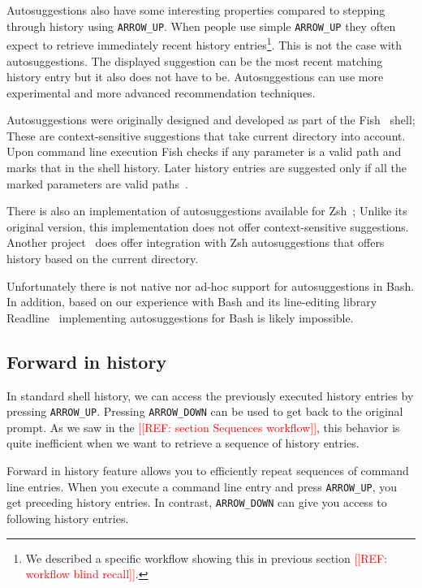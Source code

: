 \documentclass[thesis=M,english]{FITthesis}[2012/10/20]
\newcommand{\redtext}[1]{\textcolor{red}{[[#1]]}}
\let\myCite\cite
\renewcommand\cite{\unskip~\myCite}
\begin{document}
Autosuggestions also have some interesting properties compared to stepping through history using \verb|ARROW_UP|.
When people use simple \verb|ARROW_UP| they often expect to retrieve immediately recent history entries\footnote{We described a specific workflow showing this in previous section \redtext{REF: workflow blind recall}.}.  This is not the case with autosuggestions. The displayed suggestion can be the most recent matching history entry but it also does not have to be. Autosuggestions can use more experimental and more advanced recommendation techniques.

Autosuggestions were originally designed and developed as part of the Fish\cite{fishdocs} shell; These are context-sensitive suggestions that take current directory into account. Upon command line execution Fish checks if any parameter is a valid path and marks that in the shell history. Later history entries are suggested only if all the marked parameters are valid paths\cite{toolsfishissueautosuggestions}.

There is also an implementation of autosuggestions available for Zsh\cite{toolszshautosuggestions}; Unlike its original version, this implementation does not offer context-sensitive suggestions. Another project\cite{toolszshhistdb} does offer integration with Zsh autosuggestions that offers history based on the current directory.

Unfortunately there is not native nor ad-hoc support for autosuggestions in Bash. In addition, based on our experience with Bash and its line-editing library Readline\cite{ramey2001gnureadline} implementing autosuggestions for Bash is likely impossible.


\subsection{Forward in history}

In standard shell history, we can access the previously executed history entries by pressing \verb|ARROW_UP|. Pressing \verb|ARROW_DOWN| can be used to get back to the original prompt.
As we saw in the \redtext{REF: section Sequences workflow}, this behavior is quite inefficient when we want to retrieve a sequence of history entries. %

Forward in history feature allows you to efficiently repeat sequences of command line entries. 
When you execute a command line entry and press \verb|ARROW_UP|, you get preceding history entries. In contrast, \verb|ARROW_DOWN| can give you access to following history entries.
\end{document}

